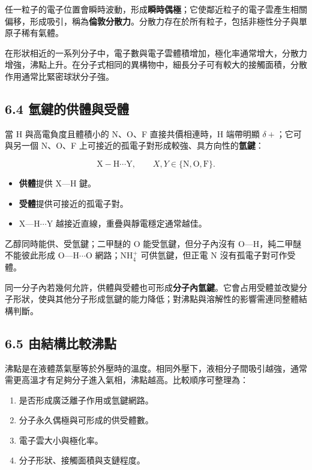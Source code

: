 \documentclass[11pt,a4paper]{article}
\providecommand{\tightlist}{%
  \setlength{\itemsep}{0pt}\setlength{\parskip}{0pt}}
\begin{document}
任一粒子的電子位置會瞬時波動，形成\textbf{瞬時偶極}；它使鄰近粒子的電子雲產生相關偏移，形成吸引，稱為\textbf{倫敦分散力}。分散力存在於所有粒子，包括非極性分子與單原子稀有氣體。

在形狀相近的一系列分子中，電子數與電子雲體積增加，極化率通常增大，分散力增強，沸點上升。在分子式相同的異構物中，細長分子可有較大的接觸面積，分散作用通常比緊密球狀分子強。

\subsection{6.4 氫鍵的供體與受體}\label{ux6c2bux9375ux7684ux4f9bux9ad4ux8207ux53d7ux9ad4}

當 H 與高電負度且體積小的 N、O、F 直接共價相連時，H 端帶明顯 \(\delta+\)；它可與另一個 N、O、F 上可接近的孤電子對形成較強、具方向性的\textbf{氫鍵}：

\[
\mathrm{X-H\cdots Y},\qquad X,Y\in\{\mathrm N,\mathrm O,\mathrm F\}.
\]

\begin{itemize}
\tightlist
\item
  \textbf{供體}提供 X---H 鍵。
\item
  \textbf{受體}提供可接近的孤電子對。
\item
  X---H\(\cdots\)Y 越接近直線，重疊與靜電穩定通常越佳。
\end{itemize}

乙醇同時能供、受氫鍵；二甲醚的 O 能受氫鍵，但分子內沒有 O---H，純二甲醚不能彼此形成 O---H\(\cdots\)O 網路；NH\(_4^+\) 可供氫鍵，但正電 N 沒有孤電子對可作受體。

同一分子內若幾何允許，供體與受體也可形成\textbf{分子內氫鍵}。它會占用受體並改變分子形狀，使與其他分子形成氫鍵的能力降低；對沸點與溶解性的影響需連同整體結構判斷。

\subsection{6.5 由結構比較沸點}\label{ux7531ux7d50ux69cbux6bd4ux8f03ux6cb8ux9ede}

沸點是在液體蒸氣壓等於外壓時的溫度。相同外壓下，液相分子間吸引越強，通常需更高溫才有足夠分子進入氣相，沸點越高。比較順序可整理為：

\begin{enumerate}
\def\labelenumi{\arabic{enumi}.}
\tightlist
\item
  是否形成廣泛離子作用或氫鍵網路。
\item
  分子永久偶極與可形成的供受體數。
\item
  電子雲大小與極化率。
\item
  分子形狀、接觸面積與支鏈程度。
\end{enumerate}
\end{document}
